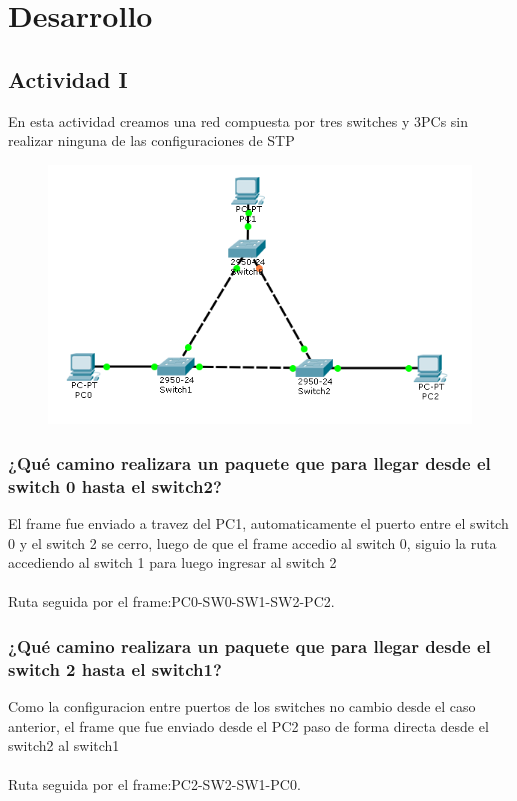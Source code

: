 \documentclass[spanish]{udpreport}
\begin{document}
\chapter{Desarrollo}
\section{Actividad I}
En esta actividad creamos una red compuesta por tres switches y 3PCs sin realizar ninguna de las configuraciones de STP

\begin{figure}[H]
\begin{center}
\includegraphics[scale=0.7]{images/sinSTP.PNG}
\end{center}
\end{figure}
\subsection{ ¿Qué camino realizara un paquete que para llegar desde el switch 0 hasta el switch2?}
El frame fue enviado a travez del PC1, automaticamente el puerto entre el switch 0 y el switch 2 se cerro, luego de que el frame accedio al switch 0, siguio la ruta accediendo al switch 1 para luego ingresar al switch 2 \\\\
Ruta seguida por el frame:PC0-SW0-SW1-SW2-PC2.

\subsection{ ¿Qué camino realizara un paquete que para llegar desde el switch 2 hasta el switch1?}
Como la configuracion entre puertos de los switches no cambio desde el caso anterior, el frame que fue enviado desde el PC2 paso de forma directa desde el switch2 al switch1\\\\
Ruta seguida por el frame:PC2-SW2-SW1-PC0.
\end{document}
